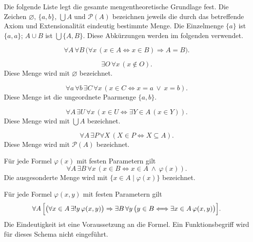 Die folgende Liste legt die gesamte mengentheoretische Grundlage fest.
Die Zeichen $\varnothing$, $\{a,b\}$, $\bigcup A$ und
$\mathcal P(A)$ bezeichnen jeweils die durch das betreffende Axiom
und Extensionalität eindeutig bestimmte Menge.
Die Einzelmenge $\{a\}$ ist $\{a,a\}$; $A\cup B$ ist
$\bigcup\{A,B\}$. Diese Abkürzungen werden im folgenden verwendet.
\cite{pila,koepke}

\begin{axiom}[Extensionalität]
\[
 \forall A\,\forall B\,
 \bigl(\forall x\,(x\in A\Longleftrightarrow x\in B)
          \Rightarrow A=B\bigr).
\]
\end{axiom}

\begin{axiom}
\[
 \exists O\,\forall x\,(x\notin O).
\]
Diese Menge wird mit $\varnothing$ bezeichnet.
\end{axiom}

\begin{axiom}[Paarmenge]
\[
 \forall a\,\forall b\,\exists C\,\forall x\,
       (x\in C\Longleftrightarrow x=a\ \lor\ x=b).
\]
Diese Menge ist die ungeordnete Paarmenge $\{a,b\}$.
\end{axiom}

\begin{axiom}[Vereinigung]
\[
 \forall A\,\exists U\,\forall x\,
       (x\in U\Longleftrightarrow \exists Y\in A\,(x\in Y)).
\]
Diese Menge wird mit $\bigcup A$ bezeichnet.
\end{axiom}

\begin{axiom}[Potenzmenge]
\[
 \forall A\,\exists P\,\forall X\,
       (X\in P\Longleftrightarrow X\subseteq A).
\]
Diese Menge wird mit $\mathcal P(A)$ bezeichnet.
\end{axiom}

\begin{axiom}[Aussonderungsschema]
Für jede Formel $\varphi(x)$ mit festen Parametern gilt
\[
 \forall A\,\exists B\,\forall x\,
 (x\in B\Longleftrightarrow x\in A\ \land\ \varphi(x)).
\]
Die ausgesonderte Menge wird mit $\{x\in A\mid\varphi(x)\}$
bezeichnet.
\end{axiom}

\begin{axiom}[Ersetzungsschema]
Für jede Formel $\varphi(x,y)$ mit festen Parametern gilt
\[
 \forall A\,\Bigl[
 \bigl(\forall x\in A\,\exists!y\,\varphi(x,y)\bigr)
 \Rightarrow
 \exists B\,\forall y\,
 \bigl(y\in B\Longleftrightarrow
                 \exists x\in A\,\varphi(x,y)\bigr)\Bigr].
\]
Die Eindeutigkeit ist eine Voraussetzung an die Formel.
Ein Funktionsbegriff wird für dieses Schema nicht eingeführt.
\end{axiom}

